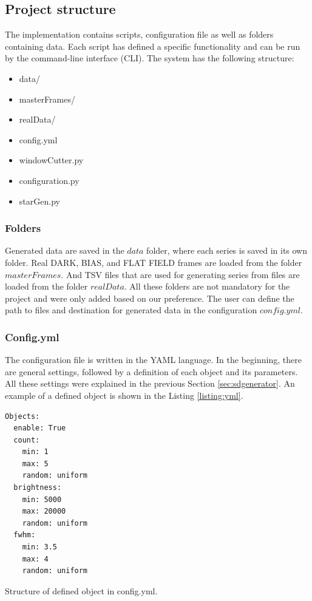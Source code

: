 \subsection{Project structure}

The implementation contains scripts, configuration file as well as folders containing data. Each script has defined a specific functionality and can be run by the command-line interface (CLI). The system has the following structure:

\begin{itemize}
    \item data/
    \item masterFrames/
    \item realData/
    \item config.yml
    \item windowCutter.py
    \item configuration.py
    \item starGen.py
\end{itemize}


\subsubsection{Folders}
Generated data are saved in the $data$ folder, where each series is saved in its own folder. Real DARK, BIAS, and FLAT FIELD frames are loaded from the folder $masterFrames$. And TSV files that are used for generating series from files are loaded from the folder $realData$. All these folders are not mandatory for the project and were only added based on our preference. The user can define the path to files and destination for generated data in the configuration $config.yml$. 

\subsubsection{Config.yml}
The configuration file is written in the YAML language. In the beginning, there are general settings, followed by a definition of each object and its parameters. All these settings were explained in the previous Section \ref{sec:sdgenerator}. An example of a defined object is shown in the Listing \ref{listing:yml}.

\begin{listing}[!ht]
\begin{verbatim}
Objects:
  enable: True
  count:
    min: 1
    max: 5
    random: uniform
  brightness:
    min: 5000
    max: 20000
    random: uniform
  fwhm:
    min: 3.5
    max: 4
    random: uniform
\end{verbatim}
\caption{Structure of defined object in config.yml.}
\label{listing:yml}
\end{listing}


